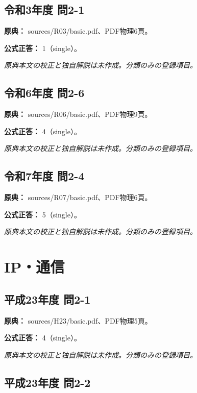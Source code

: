 \subsection{令和3年度 問2-1}
\label{q:r03-reg-basic-2-1}

\noindent\textbf{原典：} sources/R03/basic.pdf、PDF物理6頁。

\textbf{公式正答：} 1（single）。

\par\textit{原典本文の校正と独自解説は未作成。分類のみの登録項目。}

\subsection{令和6年度 問2-6}
\label{q:r06-reg-basic-2-6}

\noindent\textbf{原典：} sources/R06/basic.pdf、PDF物理9頁。

\textbf{公式正答：} 4（single）。

\par\textit{原典本文の校正と独自解説は未作成。分類のみの登録項目。}

\subsection{令和7年度 問2-4}
\label{q:r07-reg-basic-2-4}

\noindent\textbf{原典：} sources/R07/basic.pdf、PDF物理6頁。

\textbf{公式正答：} 5（single）。

\par\textit{原典本文の校正と独自解説は未作成。分類のみの登録項目。}

\section{IP・通信}

\subsection{平成23年度 問2-1}
\label{q:h23-reg-basic-2-1}

\noindent\textbf{原典：} sources/H23/basic.pdf、PDF物理5頁。

\textbf{公式正答：} 4（single）。

\par\textit{原典本文の校正と独自解説は未作成。分類のみの登録項目。}

\subsection{平成23年度 問2-2}
\label{q:h23-reg-basic-2-2}

